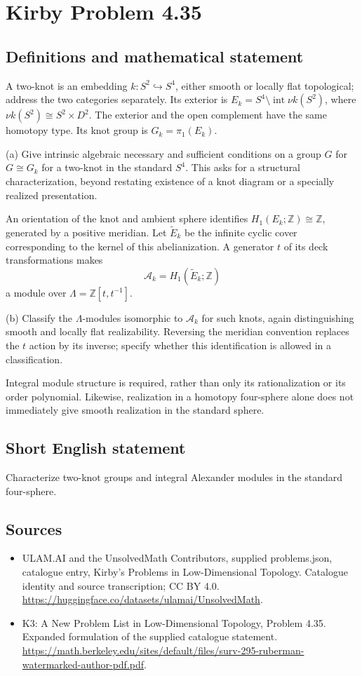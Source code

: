\documentclass[11pt,a4paper]{article}
\begin{document}
\section*{Kirby Problem 4.35}\label{statement}

\subsection{Definitions and mathematical statement}
A two-knot is an embedding $k:S^2\hookrightarrow S^4$, either smooth or locally flat topological; address the two categories separately. Its exterior is $E_k=S^4\setminus\operatorname{int}\nu k(S^2)$, where $\nu k(S^2)\cong S^2\times D^2$. The exterior and the open complement have the same homotopy type. Its knot group is $G_k=\pi_1(E_k)$.

(a) Give intrinsic algebraic necessary and sufficient conditions on a group $G$ for $G\cong G_k$ for a two-knot in the standard $S^4$. This asks for a structural characterization, beyond restating existence of a knot diagram or a specially realized presentation.

An orientation of the knot and ambient sphere identifies $H_1(E_k;\mathbb Z)\cong\mathbb Z$, generated by a positive meridian. Let $\widetilde E_k$ be the infinite cyclic cover corresponding to the kernel of this abelianization. A generator $t$ of its deck transformations makes
\[
\mathcal A_k=H_1(\widetilde E_k;\mathbb Z)
\]
a module over $\Lambda=\mathbb Z[t,t^{-1}]$.

(b) Classify the $\Lambda$-modules isomorphic to $\mathcal A_k$ for such knots, again distinguishing smooth and locally flat realizability. Reversing the meridian convention replaces the $t$ action by its inverse; specify whether this identification is allowed in a classification.

Integral module structure is required, rather than only its rationalization or its order polynomial. Likewise, realization in a homotopy four-sphere alone does not immediately give smooth realization in the standard sphere.
\subsection{Short English statement}
Characterize two-knot groups and integral Alexander modules in the standard four-sphere.
\subsection{Sources}
\begin{itemize}
\item[S1] ULAM.AI and the UnsolvedMath Contributors, supplied problems.json, catalogue entry, Kirby's Problems in Low-Dimensional Topology. Catalogue identity and source transcription; CC BY 4.0.
\url{https://huggingface.co/datasets/ulamai/UnsolvedMath}.
\item[S2] K3: A New Problem List in Low-Dimensional Topology, Problem 4.35. Expanded formulation of the supplied catalogue statement.
\url{https://math.berkeley.edu/sites/default/files/surv-295-ruberman-watermarked-author-pdf.pdf}.
\end{itemize}
\end{document}
